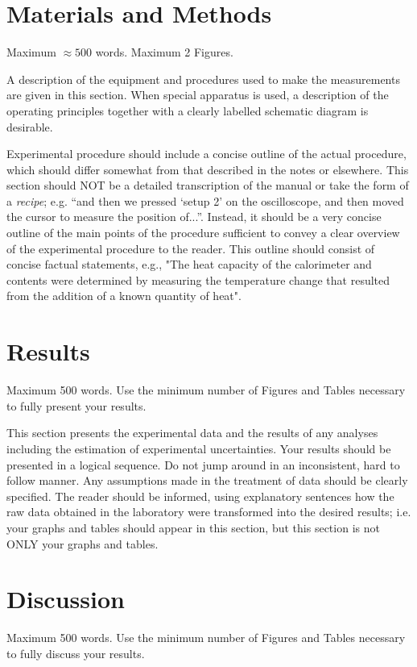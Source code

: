 \documentclass[12pt]{article}
\begin{document}
\section{Materials and Methods}
Maximum $\approx500$ words.  Maximum 2 Figures.

A description of the equipment and procedures used to make the measurements are given in this section. When special apparatus is used, a description of the operating principles together with a clearly labelled schematic diagram is desirable. 

 	Experimental procedure should include a concise outline of the actual procedure, which should differ somewhat from that described in the notes or elsewhere. This section should NOT be a detailed transcription of the manual or take the form of a \textit{recipe}; e.g. “and then we pressed ‘setup 2’ on the oscilloscope, and then moved the cursor to measure the position of...”. Instead, it should be a very concise outline of the main points of the procedure sufficient to convey a clear overview of the experimental procedure to the reader. This outline should consist of concise factual statements, e.g., "The heat capacity of the calorimeter and contents were determined by measuring the temperature change that resulted from the addition of a known quantity of heat". 

\section{Results}
Maximum 500 words. Use the minimum number of Figures and Tables necessary to fully present your results. 

This section presents the experimental data and the results of any analyses including the estimation of experimental uncertainties.  Your results should be presented in a logical sequence.  Do not jump around in an inconsistent, hard to follow manner. Any assumptions made in the treatment of data should be clearly specified.  The reader should be informed, using explanatory sentences how the raw data obtained in the laboratory were transformed into the desired results; i.e. your graphs and tables should appear in this section, but this section is not ONLY your graphs and tables.    

\section{Discussion}
Maximum 500 words. Use the minimum number of Figures and Tables necessary to fully discuss your results. 
\end{document}
